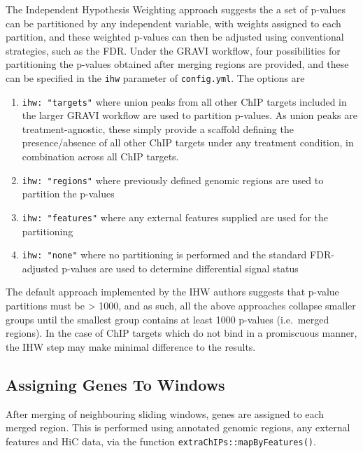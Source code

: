 \documentclass[
]{book}
\providecommand{\tightlist}{%
  \setlength{\itemsep}{0pt}\setlength{\parskip}{0pt}}
\begin{document}
The Independent Hypothesis Weighting approach\citep{ihw} suggests the a set of p-values can be partitioned by any independent variable, with weights assigned to each partition, and these weighted p-values can then be adjusted using conventional strategies, such as the FDR.
Under the GRAVI workflow, four possibilities for partitioning the p-values obtained after merging regions are provided, and these can be specified in the \texttt{ihw} parameter of \texttt{config.yml}.
The options are

\begin{enumerate}
\def\labelenumi{\arabic{enumi}.}
\tightlist
\item
  \texttt{ihw:\ "targets"} where union peaks from all other ChIP targets included in the larger GRAVI workflow are used to partition p-values. As union peaks are treatment-agnostic, these simply provide a scaffold defining the presence/absence of all other ChIP targets under any treatment condition, in combination across all ChIP targets.
\item
  \texttt{ihw:\ "regions"} where previously defined genomic regions are used to partition the p-values
\item
  \texttt{ihw:\ "features"} where any external features supplied are used for the partitioning
\item
  \texttt{ihw:\ "none"} where no partitioning is performed and the standard FDR-adjusted p-values are used to determine differential signal status
\end{enumerate}

The default approach implemented by the IHW authors suggests that p-value partitions must be \textgreater{} 1000, and as such, all the above approaches collapse smaller groups until the smallest group contains at least 1000 p-values (i.e.~merged regions).
In the case of ChIP targets which do not bind in a promiscuous manner, the IHW step may make minimal difference to the results.

\hypertarget{assigning-genes-to-windows}{%
\subsection*{Assigning Genes To Windows}\label{assigning-genes-to-windows}}

After merging of neighbouring sliding windows, genes are assigned to each merged region.
This is performed using annotated genomic regions, any external features and HiC data, via the function \texttt{extraChIPs::mapByFeatures()}.
\end{document}
